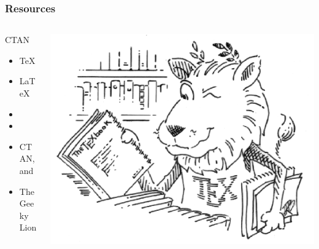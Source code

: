 \documentclass[]{beamer} %
\begin{document}
\begin{frame}%
\frametitle{Resources}
\begin{columns}[c]
\begin{column}{.25\textwidth}
\begin{block}{CTAN}
\footnotesize{
\begin{itemize}
  \item     \TeX
  \item     \LaTeX
  \item     \LaTeXe
  \item 	\XeTeX
  \item     CTAN, and
  \item     The Geeky Lion
\end{itemize}}
\end{block}
\end{column}

\begin{column}{.75\textwidth}
 \includegraphics[width=\textwidth]{Logo/CTAN_Lion.png}
\end{column}
\end{columns}
\end{frame}
\end{document}
